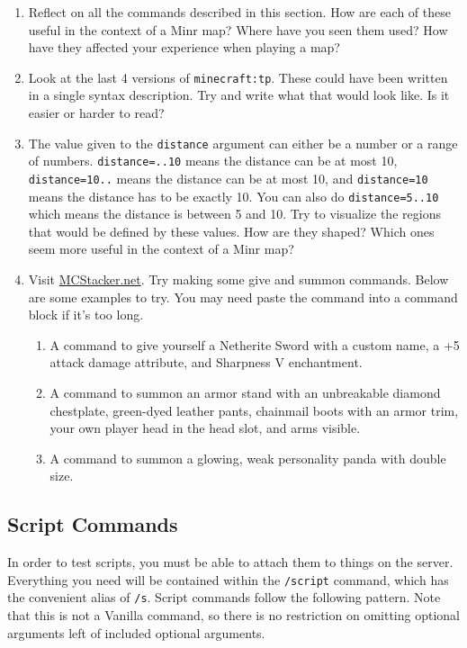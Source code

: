 \documentclass[oneside]{book}
\begin{document}
\begin{thinkbox}
\begin{enumerate}
    \item Reflect on all the commands described in this section. How are each of these useful in the context of a Minr map? Where have you seen them used? How have they affected your experience when playing a map?
    \item Look at the last 4 versions of \texttt{minecraft:tp}. These could have been written in a single syntax description. Try and write what that would look like. Is it easier or harder to read?
    \item The value given to the \texttt{distance} argument can either be a number or a range of numbers. \texttt{distance=..10} means the distance can be at most 10, \texttt{distance=10..} means the distance can be at most 10, and \texttt{distance=10} means the distance has to be exactly 10. You can also do \texttt{distance=5..10} which means the distance is between 5 and 10. Try to visualize the regions that would be defined by these values. How are they shaped? Which ones seem more useful in the context of a Minr map?
    \item Visit \href{https://mcstacker.net/}{MCStacker.net}. Try making some give and summon commands. Below are some examples to try. You may need paste the command into a command block if it's too long.
    \begin{enumerate}
        \item A command to give yourself a Netherite Sword with a custom name, a +5 attack damage attribute, and Sharpness V enchantment.
        \item A command to summon an armor stand with an unbreakable diamond chestplate, green-dyed leather pants, chainmail boots with an armor trim, your own player head in the head slot, and arms visible.
        \item A command to summon a glowing, weak personality panda with double size.
    \end{enumerate}
    
\end{enumerate}
\end{thinkbox}

\subsection{Script Commands} \label{subsec:script-commands}

In order to test scripts, you must be able to attach them to things on the server. Everything you need will be contained within the \texttt{/script} command, which has the convenient alias of \texttt{/s}. Script commands follow the following pattern. Note that this is not a Vanilla command, so there is no restriction on omitting optional arguments left of included optional arguments.
\end{document}

